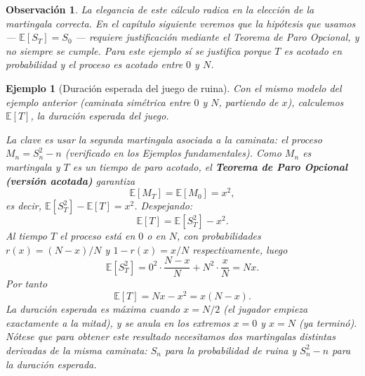 \documentclass[12pt]{book}
\newtheorem{example}{Ejemplo}[chapter]
\newtheorem{remark}{Observación}[chapter]
\begin{document}
\begin{remark}
    La elegancia de este cálculo radica en la elección de la martingala correcta. En el capítulo siguiente veremos que la hipótesis que usamos — $\mathbb{E}[S_T] = S_0$ — requiere justificación mediante el Teorema de Paro Opcional, y no siempre se cumple. Para este ejemplo sí se justifica porque $T$ es acotado en probabilidad y el proceso es acotado entre $0$ y $N$.
\end{remark}

\begin{example}[Duración esperada del juego de ruina]
\label{ej:duracion_ruina}
    Con el mismo modelo del ejemplo anterior (caminata simétrica entre $0$ y $N$, partiendo de $x$), calculemos $\mathbb{E}[T]$, la duración esperada del juego.

    \smallskip
    La clave es usar la \emph{segunda} martingala asociada a la caminata: el proceso $M_n = S_n^2 - n$ (verificado en los Ejemplos fundamentales). Como $M_n$ es martingala y $T$ es un tiempo de paro acotado, el \textbf{Teorema de Paro Opcional (versión acotada)} garantiza
    \[
        \mathbb{E}[M_T] = \mathbb{E}[M_0] = x^2,
    \]
    es decir, $\mathbb{E}[S_T^2] - \mathbb{E}[T] = x^2$. Despejando:
    \[
        \mathbb{E}[T] = \mathbb{E}[S_T^2] - x^2.
    \]
    Al tiempo $T$ el proceso está en $0$ o en $N$, con probabilidades $r(x) = (N-x)/N$ y $1-r(x) = x/N$ respectivamente, luego
    \[
        \mathbb{E}[S_T^2] = 0^2 \cdot \frac{N-x}{N} + N^2 \cdot \frac{x}{N} = Nx.
    \]
    Por tanto
    \[
        \boxed{\mathbb{E}[T] = Nx - x^2 = x(N - x)}.
    \]
    La duración esperada es máxima cuando $x = N/2$ (el jugador empieza exactamente a la mitad), y se anula en los extremos $x = 0$ y $x = N$ (ya terminó). Nótese que para obtener este resultado necesitamos \emph{dos} martingalas distintas derivadas de la misma caminata: $S_n$ para la probabilidad de ruina y $S_n^2 - n$ para la duración esperada.
\end{example}
\end{document}

